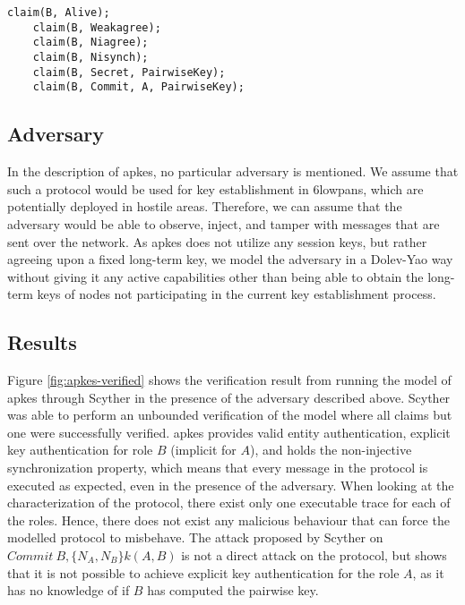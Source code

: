 \begin{lstlisting}[caption={Security claims for role B in APKES.}, label={lst:claims-b-apkes}, style=code-listings]
	claim(B, Alive);
	claim(B, Weakagree);
	claim(B, Niagree);
	claim(B, Nisynch);
	claim(B, Secret, PairwiseKey);
	claim(B, Commit, A, PairwiseKey);
\end{lstlisting}


\subsection{Adversary}

In the description of \gls{apkes}, no particular adversary is mentioned. We assume that such a protocol would be used for key establishment in \gls{6lowpan}s, which are potentially deployed in hostile areas. Therefore, we can assume that the adversary would be able to observe, inject, and tamper with messages that are sent over the network. As \gls{apkes} does not utilize any session keys, but rather agreeing upon a fixed long-term key, we model the adversary in a Dolev-Yao way without giving it any active capabilities other than being able to obtain the long-term keys of nodes not participating in the current key establishment process. 

\subsection{Results}

Figure \ref{fig:apkes-verified} shows the verification result from running the model of \gls{apkes} through Scyther in the presence of the adversary described above. Scyther was able to perform an unbounded verification of the model where all claims but one were successfully verified. \gls{apkes} provides valid entity authentication, explicit key authentication for role $B$ (implicit for $A$), and holds the non-injective synchronization property, which means that every message in the protocol is executed as expected, even in the presence of the adversary. When looking at the characterization of the protocol, there exist only one executable trace for each of the roles. Hence, there does not exist any malicious behaviour that can force the modelled protocol to misbehave. The attack proposed by Scyther on $Commit\ B, \{N_A, N_B\}k(A,B)$ is not a direct attack on the protocol, but shows that it is not possible to achieve explicit key authentication for the role $A$, as it has no knowledge of if $B$ has computed the pairwise key. 


